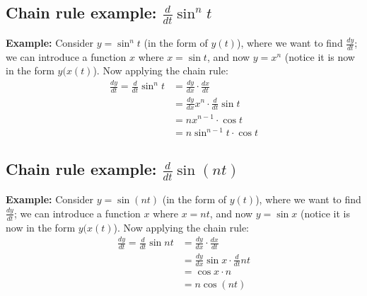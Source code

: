 \documentclass{report}
\begin{document}
\subsection{Chain rule example: $\frac{d}{dt}\sin^nt$} %
\textbf{Example:} Consider $y=\sin^{n}t$ (in the form of $y(t)$), where we want to
find $\frac{dy}{dt}$; we can introduce a function $x$ where $x=\sin t$, and now 
$y=x^{n}$ (notice it is now in the form $y(x(t)$). Now applying the chain rule:
\begin{align*}
\frac{dy}{dt}=\frac{d}{dt}\sin^{n}t&=\frac{dy}{dx}\cdot\frac{dx}{dt}\\
&=\frac{dy}{dx}x^{n}\cdot\frac{d}{dt}\sin t\\
&=nx^{n-1}\cdot\cos t\\
&=n\sin^{n-1} t\cdot\cos t
\end{align*}
\newpage

\subsection{Chain rule example: $\frac{d}{dt}\sin(nt)$} %
\textbf{Example:} Consider $y=\sin(nt)$ (in the form of $y(t)$),
where we want to find $\frac{dy}{dt}$; we can introduce a function $x$ where $x=nt$, 
and now $y=\sin x$ (notice it is now in the form $y(x(t)$). Now applying the chain rule:
\begin{align*}
\frac{dy}{dt}=\frac{d}{dt}\sin nt&=\frac{dy}{dx}\cdot\frac{dx}{dt}\\
&=\frac{dy}{dx}\sin x\cdot\frac{d}{dt}nt\\
&=\cos x\cdot n\\
&=n\cos(nt)
\end{align*}
\newpage
\end{document}
